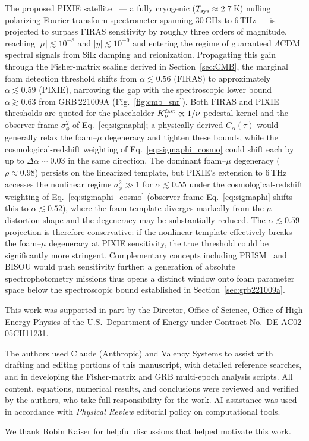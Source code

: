 \documentclass[aps,prd,onecolumn,amsmath,amssymb]{revtex4-2}
\begin{document}
The proposed PIXIE satellite~\cite{Kogut2011} --- a fully cryogenic
($T_{\rm sys}\approx2.7$\,K) nulling polarizing Fourier transform spectrometer
spanning $30$\,GHz to $6$\,THz --- is projected to surpass FIRAS sensitivity
by roughly three orders of magnitude, reaching $|\mu|\lesssim10^{-8}$ and
$|y|\lesssim10^{-9}$ and entering the regime of guaranteed $\Lambda$CDM
spectral signals from Silk damping and reionization.
Propagating this gain through the Fisher-matrix scaling derived in
Section~\ref{sec:CMB}, the marginal foam detection threshold shifts from
$\alpha\lesssim0.56$ (FIRAS) to approximately $\alpha\lesssim0.59$ (PIXIE),
narrowing the gap with the spectroscopic lower
bound $\alpha\gtrsim0.63$ from GRB\,221009A (Fig.~\ref{fig:cmb_snr}).
Both FIRAS and PIXIE thresholds are quoted for the placeholder
$K_\nu^{\rm fast}\propto 1/\nu$ pedestal kernel and the observer-frame
$\sigma_\phi^2$ of Eq.~\eqref{eq:sigmaphi}; a physically derived
$C_\alpha(\tau)$ would generally relax the foam--$\mu$ degeneracy and
tighten these bounds, while the cosmological-redshift weighting of
Eq.~\eqref{eq:sigmaphi_cosmo} could shift each by up to
$\Delta\alpha\sim 0.03$ in the same direction.
The dominant foam--$\mu$ degeneracy ($\rho\approx0.98$) persists on the
linearized template, but PIXIE's extension to $6$\,THz accesses the nonlinear
regime $\sigma_\phi^2\gg1$ for $\alpha\lesssim0.55$ under the
cosmological-redshift weighting of Eq.~\eqref{eq:sigmaphi_cosmo}
(observer-frame Eq.~\eqref{eq:sigmaphi} shifts this to
$\alpha\lesssim 0.52$), where the foam template
diverges markedly from the $\mu$-distortion shape and the degeneracy may be
substantially reduced.  The $\alpha\lesssim0.59$ projection is therefore
conservative: if the nonlinear template effectively breaks the foam--$\mu$
degeneracy at PIXIE sensitivity, the true threshold could be significantly
more stringent.
Complementary concepts including PRISM~\cite{Andre2014} and BISOU would push
sensitivity further; a generation of absolute spectrophotometry missions thus
opens a distinct window onto foam parameter space below the spectroscopic
bound established in Section~\ref{sec:grb221009a}.

\begin{acknowledgments}
This work was supported in part by the Director, Office of Science, Office of
High Energy Physics of the U.S.\ Department of Energy under Contract No.\
DE-AC02-05CH11231.

The authors used Claude (Anthropic) and Valency Systems to assist with drafting and editing portions of this manuscript, with detailed reference searches, and in developing the Fisher-matrix and GRB multi-epoch analysis scripts. All content, equations, numerical results, and conclusions were reviewed and verified by the authors, who take full responsibility for the work.  AI assistance was used in accordance with \textit{Physical Review} editorial policy on computational tools.

We thank Robin Kaiser for helpful discussions that helped motivate this work.
\end{acknowledgments}



\end{document}
